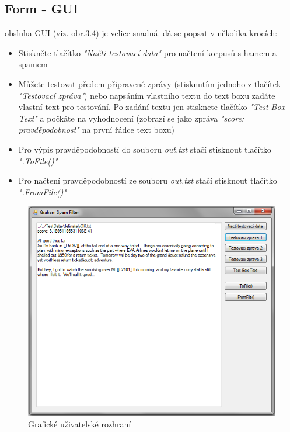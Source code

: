 \documentclass{semestralka}
\begin{document}
\subsection{Form - GUI}

obsluha GUI (viz. obr.3.4) je velice snadná. dá se popsat v několika krocích:

\begin{itemize}
\item
Stiskněte tlačítko \textit{"Načti testovací data"} pro načtení korpusů s hamem a spamem
\item
Můžete testovat předem připravené zprávy (stisknutím jednoho z tlačítek \textit{"Testovací zpráva"}) nebo napsáním vlastního textu do text boxu zadáte vlastní text pro testování. Po zadání textu jen stisknete tlačítko \textit{"Test Box Text"} a počkáte na vyhodnocení (zobrazí se jako zpráva \textit{"score: pravděpodobnost"} na první řádce text boxu)
\item
Pro výpis pravděpodobností do souboru \textit{out.txt} stačí stisknout tlačítko \textit{".ToFile()"}
\item
Pro načtení pravděpodobností ze souboru \textit{out.txt} stačí stisknout tlačítko \textit{".FromFile()"}
\end{itemize}

\begin{figure}[!ht]
  \centering
    \includegraphics[width=\textwidth]{gui.png}
    \caption{Grafické uživatelské rozhraní}
\end{figure}
\end{document}
